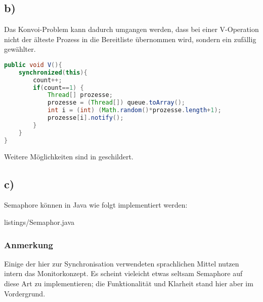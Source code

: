 \documentclass[11pt,a4paper,DIV=10,]{scrartcl}
\begin{document}
\subsection*{b)}
Das Konvoi-Problem kann dadurch umgangen werden, dass bei einer V-Operation nicht der älteste Prozess in die Bereitliste übernommen wird, sondern ein zufällig gewählter. 
\begin{lstlisting}[language=JAVA]
public void V(){
	synchronized(this){
		count++;
		if(count==1) {
			Thread[] prozesse;
			prozesse = (Thread[]) queue.toArray();
			int i = (int) (Math.random()*prozesse.length+1);
			prozesse[i].notify();
		}
	}
}
\end{lstlisting}
Weitere Möglichkeiten sind in \cite[][S. 106]{Maurer.2012} geschildert.
\subsection*{c)}
Semaphore können in Java wie folgt implementiert werden:

{listings/Semaphor.java}
\subsubsection*{Anmerkung}
Einige der hier zur Synchronisation verwendeten sprachlichen Mittel nutzen intern das Monitorkonzept. Es scheint vieleicht etwas seltsam Semaphore auf diese Art zu implementieren; die Funktionalität und Klarheit stand hier aber im Vordergrund.


\end{document}
